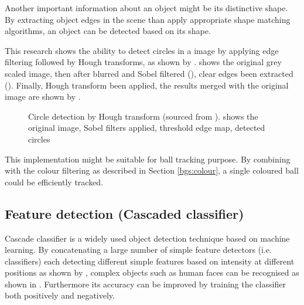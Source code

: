 Another important information about an object might be its distinctive shape. By extracting object edges in the scene than apply appropriate shape matching algorithms, an object can be detected based on its shape.

This research \cite{borovicka2003circle} shows the ability to detect circles in a image by applying edge filtering followed by Hough transforms, as shown by .  shows the original grey scaled image, then after blurred and Sobel filtered (), clear edges been extracted (). Finally, Hough transform been applied, the results merged with the original image are shown by .

\begin{figure}[H]
  \centering
  \caption{Circle detection by Hough transform (sourced from \cite{borovicka2003circle}).  shows the original image,  Sobel filters applied,  threshold edge map,  detected circles}
  \label{Figure:bg_circles}
\end{figure}

This implementation might be suitable for ball tracking purpose. By combining with the colour filtering as described in Section \ref{bgs:colour}, a single coloured ball could be efficiently tracked.

\subsection{Feature detection (Cascaded classifier)}


Cascade classifier \cite{cascade} \cite{viola2001rapid} is a widely used object detection technique based on machine learning. By concatenating a large number of simple feature detectors (i.e. classifiers) each detecting different simple features based on intensity at different positions as shown by , complex objects such as human faces can be recognised as shown in . Furthermore its accuracy can be improved by training the classifier both positively and negatively.

